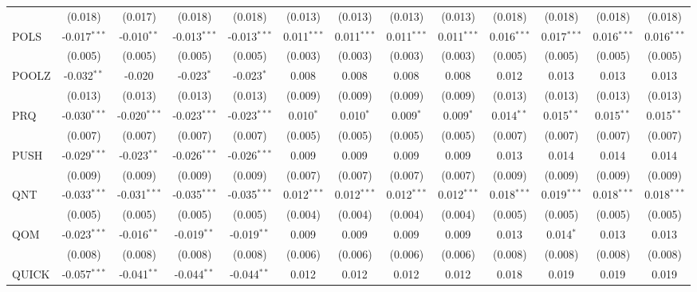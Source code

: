 \begin{table}[!htbp]
\begin{tabular}{@{\extracolsep{5pt}}lcccccccccccc}
  & (0.018) & (0.017) & (0.018) & (0.018) & (0.013) & (0.013) & (0.013) & (0.013) & (0.018) & (0.018) & (0.018) & (0.018) \\
 POLS & -0.017$^{***}$ & -0.010$^{**}$ & -0.013$^{***}$ & -0.013$^{***}$ & 0.011$^{***}$ & 0.011$^{***}$ & 0.011$^{***}$ & 0.011$^{***}$ & 0.016$^{***}$ & 0.017$^{***}$ & 0.016$^{***}$ & 0.016$^{***}$ \\
  & (0.005) & (0.005) & (0.005) & (0.005) & (0.003) & (0.003) & (0.003) & (0.003) & (0.005) & (0.005) & (0.005) & (0.005) \\
 POOLZ & -0.032$^{**}$ & -0.020$^{}$ & -0.023$^{*}$ & -0.023$^{*}$ & 0.008$^{}$ & 0.008$^{}$ & 0.008$^{}$ & 0.008$^{}$ & 0.012$^{}$ & 0.013$^{}$ & 0.013$^{}$ & 0.013$^{}$ \\
  & (0.013) & (0.013) & (0.013) & (0.013) & (0.009) & (0.009) & (0.009) & (0.009) & (0.013) & (0.013) & (0.013) & (0.013) \\
 PRQ & -0.030$^{***}$ & -0.020$^{***}$ & -0.023$^{***}$ & -0.023$^{***}$ & 0.010$^{*}$ & 0.010$^{*}$ & 0.009$^{*}$ & 0.009$^{*}$ & 0.014$^{**}$ & 0.015$^{**}$ & 0.015$^{**}$ & 0.015$^{**}$ \\
  & (0.007) & (0.007) & (0.007) & (0.007) & (0.005) & (0.005) & (0.005) & (0.005) & (0.007) & (0.007) & (0.007) & (0.007) \\
 PUSH & -0.029$^{***}$ & -0.023$^{**}$ & -0.026$^{***}$ & -0.026$^{***}$ & 0.009$^{}$ & 0.009$^{}$ & 0.009$^{}$ & 0.009$^{}$ & 0.013$^{}$ & 0.014$^{}$ & 0.014$^{}$ & 0.014$^{}$ \\
  & (0.009) & (0.009) & (0.009) & (0.009) & (0.007) & (0.007) & (0.007) & (0.007) & (0.009) & (0.009) & (0.009) & (0.009) \\
 QNT & -0.033$^{***}$ & -0.031$^{***}$ & -0.035$^{***}$ & -0.035$^{***}$ & 0.012$^{***}$ & 0.012$^{***}$ & 0.012$^{***}$ & 0.012$^{***}$ & 0.018$^{***}$ & 0.019$^{***}$ & 0.018$^{***}$ & 0.018$^{***}$ \\
  & (0.005) & (0.005) & (0.005) & (0.005) & (0.004) & (0.004) & (0.004) & (0.004) & (0.005) & (0.005) & (0.005) & (0.005) \\
 QOM & -0.023$^{***}$ & -0.016$^{**}$ & -0.019$^{**}$ & -0.019$^{**}$ & 0.009$^{}$ & 0.009$^{}$ & 0.009$^{}$ & 0.009$^{}$ & 0.013$^{}$ & 0.014$^{*}$ & 0.013$^{}$ & 0.013$^{}$ \\
  & (0.008) & (0.008) & (0.008) & (0.008) & (0.006) & (0.006) & (0.006) & (0.006) & (0.008) & (0.008) & (0.008) & (0.008) \\
 QUICK & -0.057$^{***}$ & -0.041$^{**}$ & -0.044$^{**}$ & -0.044$^{**}$ & 0.012$^{}$ & 0.012$^{}$ & 0.012$^{}$ & 0.012$^{}$ & 0.018$^{}$ & 0.019$^{}$ & 0.019$^{}$ & 0.019$^{}$ \\

\end{tabular}
\end{table}
